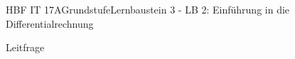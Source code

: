 \documentclass[oneside,openany,headings=optiontotoc,11pt,numbers=noenddot]{scrreprt}
\begin{document}
	\begin{worksheet}{HBF IT 17A}{Grundstufe}{Lernbaustein 3 - LB 2: Einführung in die Differentialrechnung}
		
		\noindent
		\begin{framed}
			
		\end{framed}

		\setlength{\fboxsep}{1mm}
		\begin{framed}
			\tiny{\color{codegray}Leitfrage}\\
			\par
			\bigskip
		\end{framed}
	
		\begin{framed}
			
		\end{framed}
	
		\begin{framed}
			
		\end{framed}
		\begin{framed}
			
		\end{framed}		
	\end{worksheet}
\end{document}
